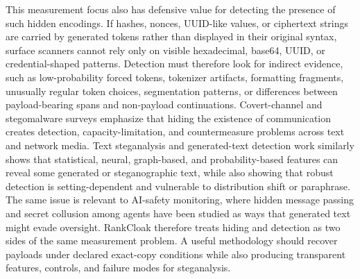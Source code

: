 \documentclass[fleqn,10pt]{wlscirep}
\begin{document}
This measurement focus also has defensive value for detecting the presence of such hidden encodings. If hashes, nonces, UUID-like values, or ciphertext strings are carried by generated tokens rather than displayed in their original syntax, surface scanners cannot rely only on visible hexadecimal, base64, UUID, or credential-shaped patterns. Detection must therefore look for indirect evidence, such as low-probability forced tokens, tokenizer artifacts, formatting fragments, unusually regular token choices, segmentation patterns, or differences between payload-bearing spans and non-payload continuations. Covert-channel and stegomalware surveys emphasize that hiding the existence of communication creates detection, capacity-limitation, and countermeasure problems across text and network media\cite{Zander2007CovertChannelsCountermeasures,Badar2025StegomalwareSurvey}. Text steganalysis and generated-text detection work similarly shows that statistical, neural, graph-based, and probability-based features can reveal some generated or steganographic text, while also showing that robust detection is setting-dependent and vulnerable to distribution shift or paraphrase\cite{Wen2019CNNTextSteganalysis,Wu2021GNNLinguisticSteganalysis,Wang2023FewShotLinguisticSteganalysis,Gehrmann2019GLTR,Mitchell2023DetectGPT,Sadasivan2025AIDetection}. The same issue is relevant to AI-safety monitoring, where hidden message passing and secret collusion among agents have been studied as ways that generated text might evade oversight\cite{Motwani2024SecretCollusion,Zolkowski2026EarlySigns}. RankCloak therefore treats hiding and detection as two sides of the same measurement problem. A useful methodology should recover payloads under declared exact-copy conditions while also producing transparent features, controls, and failure modes for steganalysis.
\end{document}
